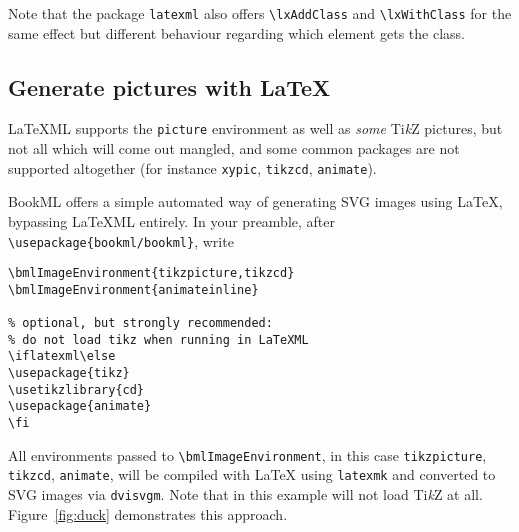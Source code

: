 \documentclass[a4paper,british]{article}
\def\tikzname{Ti\emph{k}Z}
\def\ltxinline{\lstinline[style=bookml]}
\begin{document}
Note that the package \ltxinline|latexml| also offers \ltxinline|\lxAddClass| and \ltxinline|\lxWithClass| for the same effect but different behaviour regarding which element gets the class.

\subsection{Generate pictures with \LaTeX{}}
\label{sec:external-image}

LaTeXML supports the \ltxinline|picture| environment as well as \emph{some} \tikzname{} pictures, but not all which will come out mangled, and some common packages are not supported altogether (for instance \ltxinline|xypic|, \ltxinline|tikzcd|, \ltxinline|animate|).

BookML offers a simple automated way of generating SVG images using \LaTeX{}, bypassing LaTeXML entirely. In your preamble, after \ltxinline|\usepackage{bookml/bookml}|, write
\begin{lstlisting}[style=bookml]
\bmlImageEnvironment{tikzpicture,tikzcd}
\bmlImageEnvironment{animateinline}

% optional, but strongly recommended:
% do not load tikz when running in LaTeXML
\iflatexml\else
\usepackage{tikz}
\usetikzlibrary{cd}
\usepackage{animate}
\fi
\end{lstlisting}

All environments passed to \ltxinline|\bmlImageEnvironment|, in this case \ltxinline|tikzpicture|, \ltxinline|tikzcd|, \ltxinline|animate|, will be compiled with \LaTeX{} using \lstinline[frame=none]|latexmk| and converted to SVG images via \lstinline[frame=none]|dvisvgm|. Note that in this example \LaTeXML{} will not load \tikzname{} at all. Figure~\ref{fig:duck} demonstrates this approach.
\end{document}

